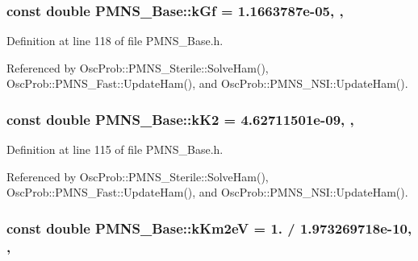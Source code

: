 \subsubsection[{\texorpdfstring{k\+Gf}{kGf}}]{\setlength{\rightskip}{0pt plus 5cm}const double P\+M\+N\+S\+\_\+\+Base\+::k\+Gf = 1.\+1663787e-\/05\hspace{0.3cm}{\ttfamily [static]}, {\ttfamily [protected]}, {\ttfamily [inherited]}}\hypertarget{classOscProb_1_1PMNS__Base_a7f26a3456128234b2ae6cc9141a6532f}{}\label{classOscProb_1_1PMNS__Base_a7f26a3456128234b2ae6cc9141a6532f}


Definition at line 118 of file P\+M\+N\+S\+\_\+\+Base.\+h.



Referenced by Osc\+Prob\+::\+P\+M\+N\+S\+\_\+\+Sterile\+::\+Solve\+Ham(), Osc\+Prob\+::\+P\+M\+N\+S\+\_\+\+Fast\+::\+Update\+Ham(), and Osc\+Prob\+::\+P\+M\+N\+S\+\_\+\+N\+S\+I\+::\+Update\+Ham().

\subsubsection[{\texorpdfstring{k\+K2}{kK2}}]{\setlength{\rightskip}{0pt plus 5cm}const double P\+M\+N\+S\+\_\+\+Base\+::k\+K2 = 4.\+62711501e-\/09\hspace{0.3cm}{\ttfamily [static]}, {\ttfamily [protected]}, {\ttfamily [inherited]}}\hypertarget{classOscProb_1_1PMNS__Base_a326fc5016d7dd7ce05682c06cdcb6d94}{}\label{classOscProb_1_1PMNS__Base_a326fc5016d7dd7ce05682c06cdcb6d94}


Definition at line 115 of file P\+M\+N\+S\+\_\+\+Base.\+h.



Referenced by Osc\+Prob\+::\+P\+M\+N\+S\+\_\+\+Sterile\+::\+Solve\+Ham(), Osc\+Prob\+::\+P\+M\+N\+S\+\_\+\+Fast\+::\+Update\+Ham(), and Osc\+Prob\+::\+P\+M\+N\+S\+\_\+\+N\+S\+I\+::\+Update\+Ham().

\subsubsection[{\texorpdfstring{k\+Km2eV}{kKm2eV}}]{\setlength{\rightskip}{0pt plus 5cm}const double P\+M\+N\+S\+\_\+\+Base\+::k\+Km2eV = 1. / 1.\+973269718e-\/10\hspace{0.3cm}{\ttfamily [static]}, {\ttfamily [protected]}, {\ttfamily [inherited]}}\hypertarget{classOscProb_1_1PMNS__Base_a382ddd7b76ca89b43f22614a2ea7327b}{}\label{classOscProb_1_1PMNS__Base_a382ddd7b76ca89b43f22614a2ea7327b}


